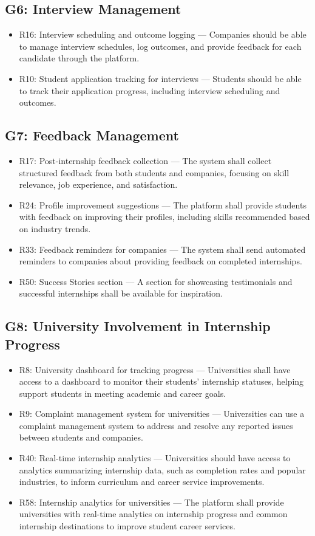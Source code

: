 \subsection{G6: Interview Management}
\begin{itemize}
    \item R16: Interview scheduling and outcome logging — Companies should be able to manage interview schedules, log outcomes, and provide feedback for each candidate through the platform.
    \item R10: Student application tracking for interviews — Students should be able to track their application progress, including interview scheduling and outcomes.
\end{itemize}

\subsection{G7: Feedback Management}
\begin{itemize}
    \item R17: Post-internship feedback collection — The system shall collect structured feedback from both students and companies, focusing on skill relevance, job experience, and satisfaction.
    \item R24: Profile improvement suggestions — The platform shall provide students with feedback on improving their profiles, including skills recommended based on industry trends.
    \item R33: Feedback reminders for companies — The system shall send automated reminders to companies about providing feedback on completed internships.
    \item R50: Success Stories section — A section for showcasing testimonials and successful internships shall be available for inspiration.
\end{itemize}

\subsection{G8: University Involvement in Internship Progress}
\begin{itemize}
    \item R8: University dashboard for tracking progress — Universities shall have access to a dashboard to monitor their students' internship statuses, helping support students in meeting academic and career goals.
    \item R9: Complaint management system for universities — Universities can use a complaint management system to address and resolve any reported issues between students and companies.
    \item R40: Real-time internship analytics — Universities should have access to analytics summarizing internship data, such as completion rates and popular industries, to inform curriculum and career service improvements.
    \item R58: Internship analytics for universities — The platform shall provide universities with real-time analytics on internship progress and common internship destinations to improve student career services.
\end{itemize}



